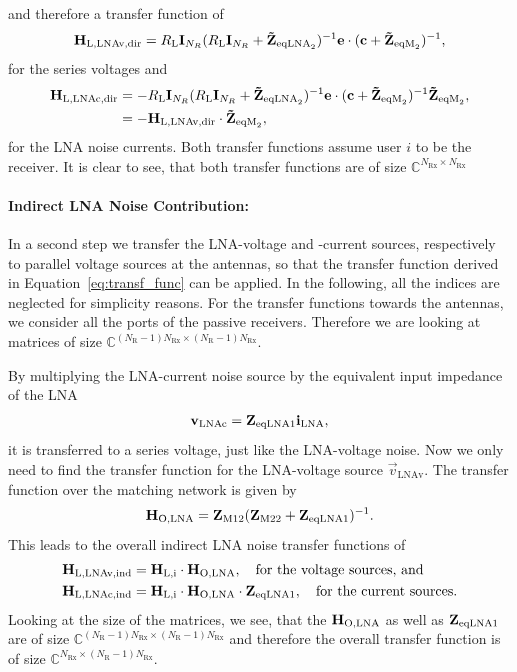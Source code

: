 and therefore a transfer function of
\begin{equation}
\mathbf{H}_\text{L,LNAv,dir} = R_\text{L}\mathbf{I}_{N_R}(R_\text{L}\mathbf{I}_{N_R} + \mathbf{\tilde{Z}}_{\text{eqLNA}_2})^{-1}\mathbf{e}\cdot(\mathbf{c}+\mathbf{\tilde{Z}}_{\text{eqM}_2})^{-1},
\end{equation}
for the series voltages and
\begin{align}\nonumber
\mathbf{H}_\text{L,LNAc,dir} &= -R_\text{L}\mathbf{I}_{N_R}(R_\text{L}\mathbf{I}_{N_R} + \mathbf{\tilde{Z}}_{\text{eqLNA}_2})^{-1}\mathbf{e}\cdot(\mathbf{c}+\mathbf{\tilde{Z}}_{\text{eqM}_2})^{-1}\mathbf{\tilde{Z}}_{\text{eqM}_2},\\
 &= - \mathbf{H}_\text{L,LNAv,dir}\cdot \mathbf{\tilde{Z}}_{\text{eqM}_2},
\end{align}
for the LNA noise currents.
Both transfer functions assume user $i$ to be the receiver.
It is clear to see, that both transfer functions are of size $\mathbb{C}^{N_\text{Rx}\times N_\text{Rx}}$

\paragraph{Indirect LNA Noise Contribution:}
In a second step we transfer the LNA-voltage and -current sources, respectively to parallel voltage sources at the antennas, so that the transfer function derived in Equation~\eqref{eq:transf_func} can be applied.
In the following, all the indices are neglected for simplicity reasons.
For the transfer functions towards the antennas, we consider all the ports of the passive receivers.
Therefore we are looking at matrices of size $\mathbb{C}^{(N_\text{R}-1)N_\text{Rx}\times (N_\text{R}-1)N_\text{Rx}}$.

By multiplying the LNA-current noise source by the equivalent input impedance of the LNA
\begin{align}
\mathbf{v}_\text{LNAc} = \mathbf{Z}_{\text{eqLNA1}} \mathbf{i}_\text{LNA},
\end{align}
it is transferred to a series voltage, just like the LNA-voltage noise.
Now we only need to find the transfer function for the LNA-voltage source $\vec{v}_\text{LNAv}$.
The transfer function over the matching network is given by
\begin{align}
\label{eq:lnanoise_to_input}
\mathbf{H}_\text{O,LNA} = \mathbf{Z}_\text{M12}(\mathbf{Z}_\text{M22}+\mathbf{Z}_{\text{eqLNA1}})^{-1}.
\end{align}
This leads to the overall indirect LNA noise transfer functions of
\begin{align}
\label{eq:lnavolt_transf}
\mathbf{H}_\text{L,LNAv,ind} &= \mathbf{H}_\text{L,i}\cdot\mathbf{H}_\text{O,LNA},\quad\text{for the voltage sources, and}\\
\label{eq:lnacurr_transf}
\mathbf{H}_\text{L,LNAc,ind} &= \mathbf{H}_\text{L,i}\cdot\mathbf{H}_\text{O,LNA}\cdot\mathbf{Z}_{\text{eqLNA1}},\quad\text{for the current sources}.
\end{align}
Looking at the size of the matrices, we see, that the $\mathbf{H}_\text{O,LNA}$ as well as $\mathbf{Z}_{\text{eqLNA1}}$ are of size $\mathbb{C}^{(N_\text{R}-1)N_\text{Rx}\times (N_\text{R}-1)N_\text{Rx}}$ and therefore the overall transfer function is of size $\mathbb{C}^{N_\text{Rx}\times (N_\text{R}-1)N_\text{Rx}}$.

